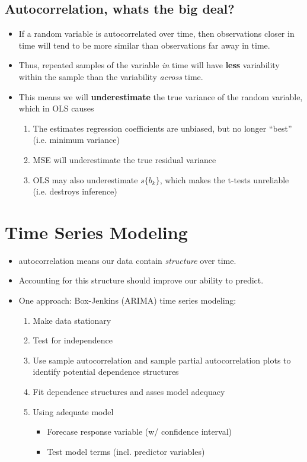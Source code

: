\documentclass[12pt]{notes}
\begin{document}
\subsection{Autocorrelation, whats the big deal?} 

\begin{itemize}[leftmargin = *]
\item If a random variable is autocorrelated over time, then observations closer in time will tend to be more similar than observations far away in time. 
\item Thus, repeated samples of the variable \textit{in} time will have \textbf{less} variability within the sample than the variability \textit{across} time. 
\item This means we will \textbf{underestimate} the true variance of the random variable, which in OLS causes
\begin{enumerate}
\item The estimates regression coefficients are unbiased, but no longer ``best'' (i.e. minimum variance)
\item MSE will underestimate the true residual variance
\item OLS may also underestimate $s\{b_k\}$, which makes the t-tests unreliable (i.e. destroys inference) 
\end{enumerate}
\end{itemize}

\section{Time Series Modeling}
\begin{itemize}
\item autocorrelation means our data contain \textit{structure} over time. 
\item Accounting for this structure should improve our ability to predict. 
\item One approach: Box-Jenkins (ARIMA) time series modeling:
\begin{enumerate}
\item Make data stationary
\item Test for independence
\item Use sample autocorrelation and sample partial autocorrelation plots to identify potential dependence structures
\item Fit dependence structures and asses model adequacy
\item Using adequate model
\begin{itemize}
\item Forecase response variable (w/ confidence interval)
\item Test model terms (incl. predictor variables)
\end{itemize}
\end{enumerate}
\end{itemize}
\end{document}
